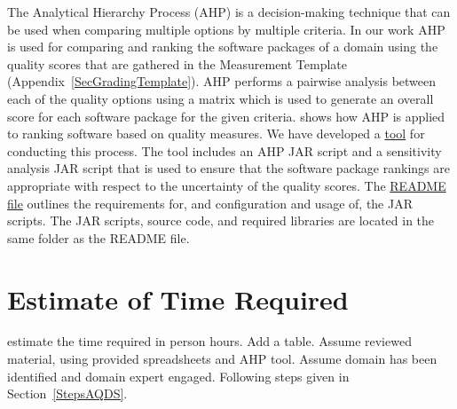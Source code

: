 \documentclass[letterpaper,cleveref]{lipics-v2019}
\begin{document}
The Analytical Hierarchy Process (AHP) is a decision-making technique that can
be used when comparing multiple options by multiple criteria. In our work AHP is
used for comparing and ranking the software packages of a domain using the
quality scores that are gathered in the Measurement Template
(Appendix~\ref{SecGradingTemplate}). AHP performs a pairwise analysis between
each of the quality options using a matrix which is used to generate an overall
score for each software package for the given criteria. \cite{SmithEtAl2016}
shows how AHP is applied to ranking software based on quality measures. We have
developed a
\href{https://github.com/smiths/AIMSS/blob/master/StateOfPractice/AHP2020/LBM/README.txt}{tool}
for conducting this process. The tool includes an AHP JAR script and a
sensitivity analysis JAR script that is used to ensure that the software package
rankings are appropriate with respect to the uncertainty of the quality scores.
The
\href{https://github.com/smiths/AIMSS/blob/master/StateOfPractice/AHP2020/LBM/README.txt}{README
file} outlines the requirements for, and configuration and usage of, the JAR
scripts. The JAR scripts, source code, and required libraries are located in the
same folder as the README file.



\section{Estimate of Time Required} \label{SecEstTimeRequired}

estimate the time required in person hours.  Add a table.  Assume reviewed
material, using provided spreadsheets and AHP tool.  Assume domain has been
identified and domain expert engaged.  Following steps given in
Section~\ref{StepsAQDS}.
\end{document}

